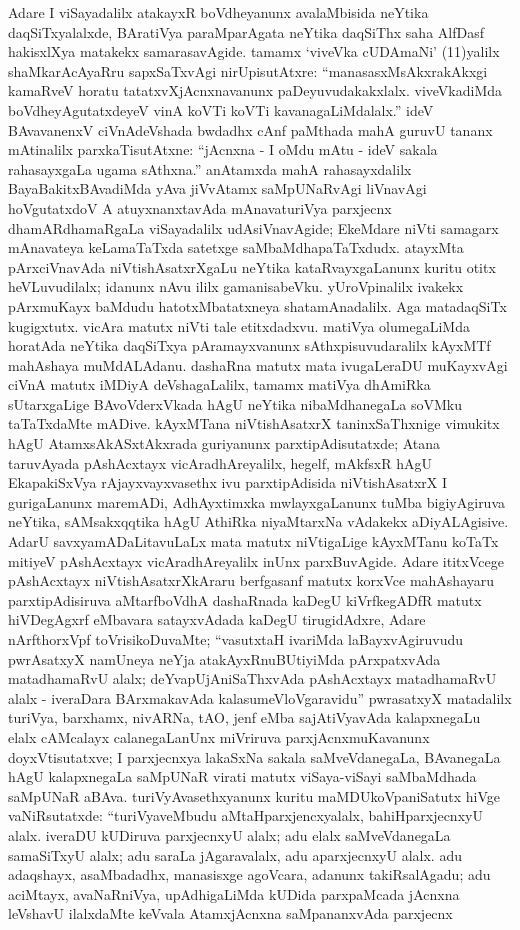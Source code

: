 Adare I viSayadalilx atakayxR boVdheyanunx avalaMbisida neYtika daqSiTxyalalxde, BAratiVya paraMparAgata neYtika daqSiThx saha AlfDasf hakisxlXya matakekx samarasavAgide. tamamx `viveVka cUDAmaNi' {\rm(11)}yalilx shaMkarAcAyaRru sapxSaTxvAgi nirUpisutAtxre: ``manasasxMsAkxrakAkxgi kamaRveV horatu tatatxvXjAcnxnavanunx paDeyuvudakakxlalx. viveVkadiMda boVdheyAgutatxdeyeV vinA koVTi koVTi kavanagaLiMdalalx.'' ideV BAvavanenxV ciVnAdeVshada bwdadhx cAnf paMthada mahA guruvU tananx mAtinalilx parxkaTisutAtxne: ``jAcnxna - I oMdu mAtu - ideV sakala rahasayxgaLa ugama sAthxna.'' anAtamxda mahA rahasayxdalilx BayaBakitxBAvadiMda yAva jiVvAtamx saMpUNaRvAgi liVnavAgi hoVgutatxdoV A atuyxnanxtavAda mAnavaturiVya parxjecnx dhamARdhamaRgaLa viSayadalilx udAsiVnavAgide; EkeMdare niVti samagarx mAnavateya keLamaTaTxda satetxge saMbaMdhapaTaTxdudx. atayxMta pArxciVnavAda niVtishAsatxrXgaLu neYtika kataRvayxgaLanunx kuritu otitx heVLuvudilalx; idanunx nAvu ililx gamanisabeVku. yUroVpinalilx ivakekx pArxmuKayx baMdudu hatotxMbatatxneya shatamAnadalilx. Aga matadaqSiTx kugigxtutx. vicAra matutx niVti tale etitxdadxvu. matiVya olumegaLiMda horatAda neYtika daqSiTxya pAramayxvanunx sAthxpisuvudaralilx kAyxMTf mahAshaya muMdALAdanu. dashaRna matutx mata ivugaLeraDU muKayxvAgi ciVnA matutx iMDiyA deVshagaLalilx, tamamx matiVya dhAmiRka sUtarxgaLige BAvoVderxVkada hAgU neYtika nibaMdhanegaLa soVMku taTaTxdaMte mADive. kAyxMTana niVtishAsatxrX taninxSaThxnige vimukitx hAgU AtamxsAkASxtAkxrada guriyanunx parxtipAdisutatxde; Atana taruvAyada pAshAcxtayx vicAradhAreyalilx, hegelf, mAkfsxR hAgU EkapakiSxVya rAjayxvayxvasethx ivu parxtipAdisida niVtishAsatxrX I gurigaLanunx maremADi, AdhAyxtimxka mwlayxgaLanunx tuMba bigiyAgiruva neYtika, sAMsakxqqtika hAgU AthiRka niyaMtarxNa vAdakekx aDiyALAgisive. AdarU savxyamADaLitavuLaLx mata matutx niVtigaLige kAyxMTanu koTaTx mitiyeV pAshAcxtayx vicAradhAreyalilx inUnx parxBuvAgide. Adare ititxVcege pAshAcxtayx niVtishAsatxrXkAraru berfgasanf matutx korxVce mahAshayaru parxtipAdisiruva aMtarfboVdhA dashaRnada kaDegU kiVrfkegADfR matutx hiVDegAgxrf eMbavara satayxvAdada kaDegU tirugidAdxre, Adare nArfthorxVpf toVrisikoDuvaMte; ``vasutxtaH ivariMda laBayxvAgiruvudu pwrAsatxyX namUneya neYja atakAyxRnuBUtiyiMda pArxpatxvAda matadhamaRvU alalx; deYvapUjAniSaThxvAda pAshAcxtayx matadhamaRvU alalx - iveraDara BArxmakavAda kalasumeVloVgaravidu'' pwrasatxyX matadalilx turiVya, barxhamx, nivARNa, tAO, jenf eMba sajAtiVyavAda kalapxnegaLu elalx cAMcalayx calanegaLanUnx miVriruva parxjAcnxmuKavanunx doyxVtisutatxve; I parxjecnxya lakaSxNa sakala saMveVdanegaLa, BAvanegaLa hAgU kalapxnegaLa saMpUNaR virati matutx viSaya-viSayi saMbaMdhada saMpUNaR aBAva. turiVyAvasethxyanunx kuritu maMDUkoVpaniSatutx hiVge vaNiRsutatxde: ``turiVyaveMbudu aMtaHparxjencxyalalx, bahiHparxjecnxyU alalx. iveraDU kUDiruva parxjecnxyU alalx; adu elalx saMveVdanegaLa samaSiTxyU alalx; adu saraLa jAgaravalalx, adu aparxjecnxyU alalx. adu adaqshayx, asaMbadadhx, manasisxge agoVcara, adanunx takiRsalAgadu; adu aciMtayx, avaNaRniVya, upAdhigaLiMda kUDida parxpaMcada jAcnxna leVshavU ilalxdaMte keVvala AtamxjAcnxna saMpananxvAda parxjecnx 